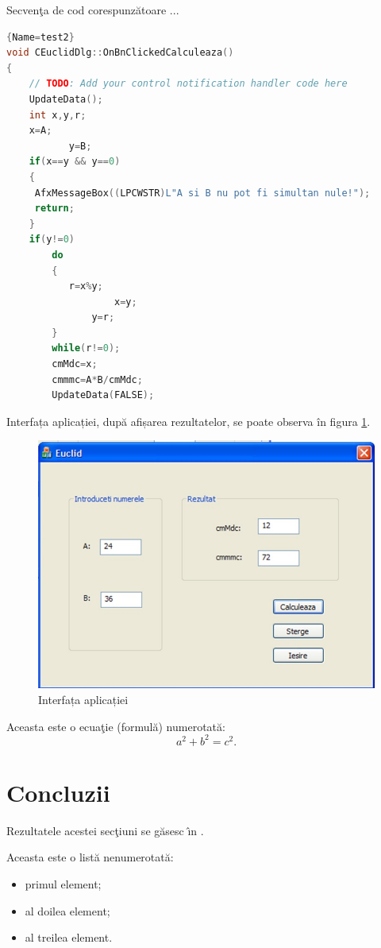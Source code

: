 \documentclass{amsart}
\begin{document}
Secven\c{t}a de cod corespunz\u{a}toare ...

\begin{lstlisting}[language=C++]{Name=test2}
void CEuclidDlg::OnBnClickedCalculeaza()
{
	// TODO: Add your control notification handler code here 
	UpdateData(); 
	int x,y,r;
	x=A;
           y=B;
	if(x==y && y==0)
	{
	 AfxMessageBox((LPCWSTR)L"A si B nu pot fi simultan nule!");
	 return;
	}
    if(y!=0)
		do
		{
		   r=x%y;
	        	   x=y;
	       	   y=r;
		}
		while(r!=0);
		cmMdc=x;
		cmmmc=A*B/cmMdc;
		UpdateData(FALSE);
 \end{lstlisting}

Interfața aplicației, după afișarea rezultatelor, se poate observa \^{i}n figura \ref{fig1}.

\begin{figure}[ht]
\includegraphics[width=12cm]{Interfata.jpg}
\caption{Interfața aplicației}
\label{fig1}
\end{figure}
 

Aceasta este o ecua\c{t}ie (formul\u{a}) numerotat\u{a}:
\begin{equation}\label{pitagora}
a^2+b^2=c^2.
\end{equation}

\section{Concluzii}

Rezultatele acestei sec\c{t}iuni se g\u{a}sesc \^{\i}n \cite{Aut}.


Aceasta este o list\u{a} nenumerotat\u{a}:
\begin{itemize}
\item primul element;
\item al doilea element;
\item al treilea element.
\end{itemize}
\end{document}
